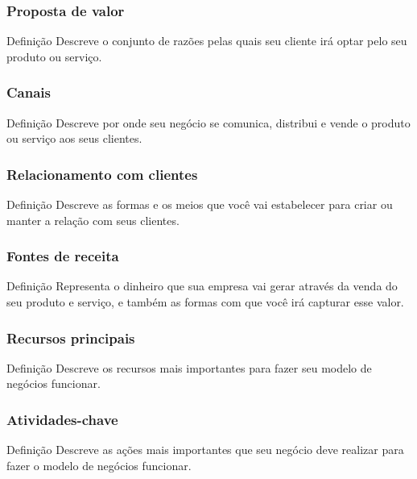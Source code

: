 \documentclass[aspectratio=169]{beamer}
\begin{document}
\begin{frame}
	\frametitle{Proposta de valor}

	\begin{block}{Defini\c cão}
		 Descreve o conjunto de razões pelas quais seu cliente irá optar pelo seu produto ou serviço.
	\end{block}
\end{frame}

\begin{frame}
	\frametitle{Canais}

	\begin{block}{Defini\c cão}
		 Descreve por onde seu negócio se comunica, distribui e vende o produto ou serviço aos seus clientes.
	\end{block}
\end{frame}

\begin{frame}
	\frametitle{Relacionamento com clientes}

	\begin{block}{Defini\c cão}
		 Descreve as formas e os meios que você vai estabelecer para criar ou manter a relação com seus clientes.
	\end{block}
\end{frame}

\begin{frame}
	\frametitle{Fontes de receita}

	\begin{block}{Defini\c cão}
		 Representa o dinheiro que sua empresa vai gerar através da venda do seu produto e serviço, e também as formas com que você irá capturar esse valor.
	\end{block}
\end{frame}

\begin{frame}
	\frametitle{Recursos principais}

	\begin{block}{Defini\c cão}
		 Descreve os recursos mais importantes para fazer seu modelo de negócios funcionar.
	\end{block}
\end{frame}

\begin{frame}
	\frametitle{Atividades-chave}

	\begin{block}{Defini\c cão}
		 Descreve as ações mais importantes que seu negócio deve realizar para fazer o modelo de negócios funcionar.
	\end{block}
\end{frame}
\end{document}
